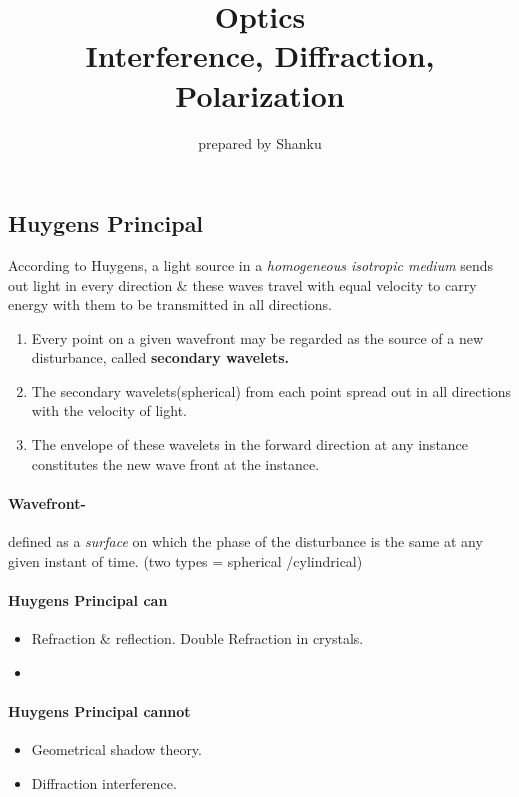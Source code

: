 \documentclass[legalpaper,10pt]{article}
\title{\textbf{\LARGE{Optics}} \\ Interference,  Diffraction, Polarization}
\author{prepared by Shanku}
\begin{document}
	\maketitle
	\begin{multicols*}{2}
		
		\section*{Huygens Principal}
		According to Huygens, a light source in a \textit{homogeneous isotropic medium} sends out light in every direction \& these waves travel with equal velocity to carry energy with them to be transmitted in all directions.
		\begin{enumerate}
			\item {Every point on a given wavefront may be regarded as the source of a new disturbance, called \bf{secondary wavelets.}}
			\item The secondary wavelets(spherical) from each point spread out in all directions with the velocity of light.
			\item The envelope of these wavelets in the forward direction at any instance constitutes the new wave front at the instance.
		\end{enumerate}
		\paragraph{Wavefront-}defined as a \textit{surface} on which the phase of the disturbance is the same at any given instant of time. (two types = spherical /cylindrical)
		\paragraph{Huygens Principal can}
		\begin{itemize}
			\item Refraction \& reflection. Double Refraction in crystals.
			\item
		\end{itemize}
		\paragraph{Huygens Principal cannot}
		\begin{itemize}
			\item Geometrical shadow theory.
			\item Diffraction interference.
		\end{itemize}
		

\end{multicols*}
\end{document}
